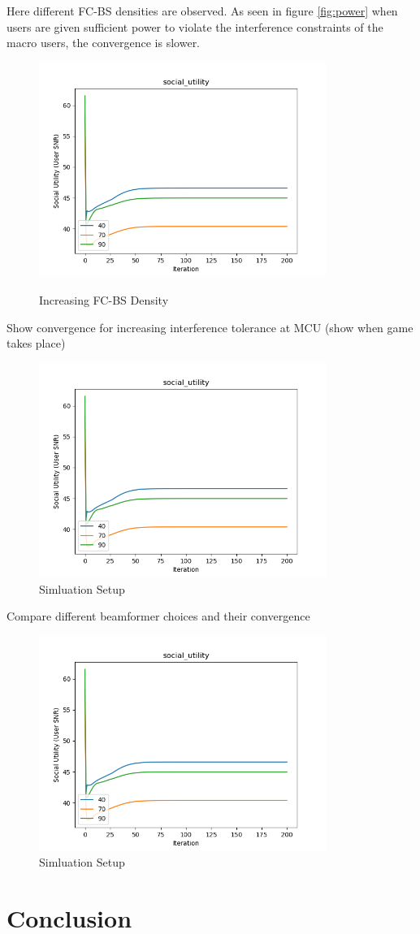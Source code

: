\documentclass[12pt,a4paper]{report}
\begin{document}
 Here different FC-BS densities are observed. As seen in figure \ref{fig:power} when users are given sufficient power to violate the interference constraints of the macro users, the convergence is slower.
\begin{figure}[h!]
	  \caption{Increasing FC-BS Density}
	  	\includegraphics[width=\textwidth,height = 7cm]{figures/increasing_macro_users}
	  \label{fig:inc_fc}
\end{figure}

Show  convergence for increasing interference tolerance at MCU (show when game takes place)
\begin{figure}[h!]
	\includegraphics[width=\textwidth,height = 7cm]{figures/increasing_macro_users}
	  \caption{Simluation Setup}
\end{figure}

Compare different beamformer choices and their convergence
\begin{figure}[h!]
	\includegraphics[width=\textwidth,height = 7cm]{figures/increasing_macro_users}
	  \caption{Simluation Setup}
\end{figure}

\chapter{Conclusion}

\newpage

\end{document}
